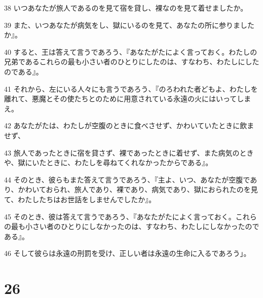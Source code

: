 \par 38 いつあなたが旅人であるのを見て宿を貸し、裸なのを見て着せましたか。
\par 39 また、いつあなたが病気をし、獄にいるのを見て、あなたの所に参りましたか』。
\par 40 すると、王は答えて言うであろう、『あなたがたによく言っておく。わたしの兄弟であるこれらの最も小さい者のひとりにしたのは、すなわち、わたしにしたのである』。
\par 41 それから、左にいる人々にも言うであろう、『のろわれた者どもよ、わたしを離れて、悪魔とその使たちとのために用意されている永遠の火にはいってしまえ。
\par 42 あなたがたは、わたしが空腹のときに食べさせず、かわいていたときに飲ませず、
\par 43 旅人であったときに宿を貸さず、裸であったときに着せず、また病気のときや、獄にいたときに、わたしを尋ねてくれなかったからである』。
\par 44 そのとき、彼らもまた答えて言うであろう、『主よ、いつ、あなたが空腹であり、かわいておられ、旅人であり、裸であり、病気であり、獄におられたのを見て、わたしたちはお世話をしませんでしたか』。
\par 45 そのとき、彼は答えて言うであろう、『あなたがたによく言っておく。これらの最も小さい者のひとりにしなかったのは、すなわち、わたしにしなかったのである』。
\par 46 そして彼らは永遠の刑罰を受け、正しい者は永遠の生命に入るであろう」。

\chapter{26}

